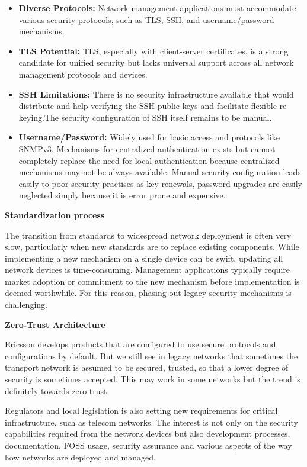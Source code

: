 \documentclass[10pt,sigconf]{iabart}
\begin{document}
\begin{itemize}
    \item \textbf{Diverse Protocols:} Network management applications must accommodate various security protocols, such as TLS, SSH, and username/password mechanisms.
    \item \textbf{TLS Potential:} TLS, especially with client-server certificates, is a strong candidate for unified security but lacks universal support across all network management protocols and devices. %
    \item \textbf{SSH Limitations:} There is no security infrastructure available that would distribute and help verifying the SSH public keys and facilitate flexible re-keying.The security configuration of SSH itself remains to be manual. %
    \item \textbf{Username/Password:} Widely used for basic access and protocols like SNMPv3. Mechanisms for centralized authentication exists but cannot completely replace the need for local authentication because centralized mechanisms may not be always available. Manual security configuration leads easily to poor security practises as key renewals, password upgrades are easily neglected simply because it is error prone and expensive.

\end{itemize}
 

\textbf{Standardization process}

The transition from standards to widespread network deployment is often very slow, particularly when new standards are to replace existing components. While implementing a new mechanism on a single device can be swift, updating all network devices is time-consuming. Management applications typically require market adoption or commitment to the new mechanism before implementation is deemed worthwhile. For this reason, phasing out legacy security mechanisms is challenging.
 
\textbf{Zero-Trust Architecture}

Ericsson develops products that are configured to use secure protocols and configurations by default. But we still see in legacy networks that sometimes the transport network is assumed to be secured, trusted, so that a lower degree of security is sometimes accepted. This may work in some networks but the trend is definitely towards zero-trust. 

Regulators and local legislation is also setting new requirements for critical infrastructure, such as telecom networks. The interest is not only on the security capabilities required from the network devices but also development processes, documentation, FOSS usage, security assurance and various aspects of the way how networks are deployed and managed.
\end{document}
